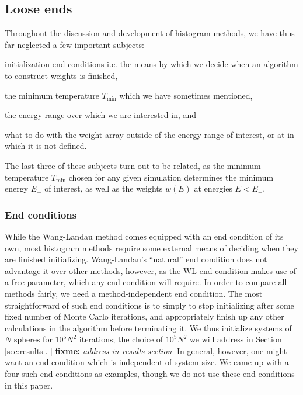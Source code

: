 \documentclass[11pt]{article}
\renewcommand{\t}{\text} %
\newcommand{\p}[1]{\left(#1\right)} %
\newcommand{\red}[1]{{\bf \color{red} #1}}
\newcommand{\fixme}[1]{[\red{fixme:} \emph{#1}]}
\begin{document}
\subsection{Loose ends}
\label{sec:loose_ends}

Throughout the discussion and development of histogram methods, we
have thus far neglected a few important subjects:
\begin{enumerate*}
\item initialization end conditions i.e. the means by which we decide
  when an algorithm to construct weights is finished,
\item the minimum temperature $T_{\t{min}}$ which we have sometimes
  mentioned,
\item the energy range over which we are interested in, and
\item what to do with the weight array outside of the energy range of
  interest, or at in which it is not defined.
\end{enumerate*}
The last three of these subjects turn out to be related, as the
minimum temperature $T_{\t{min}}$ chosen for any given simulation
determines the minimum energy $E_-$ of interest, as well as the
weights $w\p{E}$ at energies $E<E_-$.

\subsubsection{End conditions}
\label{sec:end_conditions}

While the Wang-Landau method comes equipped with an end condition of
its own, most histogram methods require some external means of
deciding when they are finished initializing. Wang-Landau's
``natural'' end condition does not advantage it over other methods,
however, as the WL end condition makes use of a free parameter, which
any end condition will require. In order to compare all methods
fairly, we need a method-independent end condition. The most
straightforward of such end conditions is to simply to stop
initializing after some fixed number of Monte Carlo iterations, and
appropriately finish up any other calculations in the algorithm before
terminating it. We thus initialize systems of $N$ spheres for
$10^5N^2$ iterations; the choice of $10^5N^2$ we will address in
Section \ref{sec:results}. \fixme{address in results section} In
general, however, one might want an end condition which is independent
of system size. We came up with a four such end conditions as
examples, though we do not use these end conditions in this paper.
\end{document}
